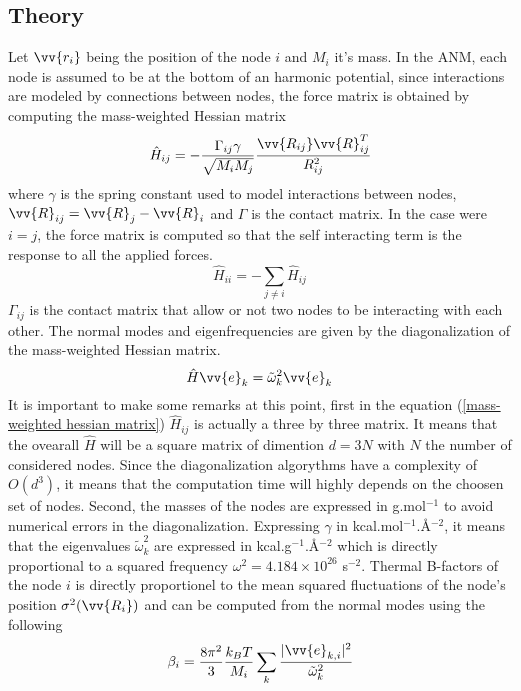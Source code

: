 \subsection{Theory}
\noindent Let $\vv{r_i}$ being the position of the node $i$ and $M_i$ it's mass. In the ANM, each node is assumed to be at the bottom of an harmonic potential, since interactions are modeled by connections between nodes, the force matrix is obtained by computing the mass-weighted Hessian matrix
\begin{equation}
	\label{mass-weighted hessian matrix}
	\hat{H}_{ij} = -\frac{\Gamma_{ij}\gamma}{\sqrt{M_iM_j}}\cfrac{\vv{R_{ij}}\vv{R}^T_ {ij}}{R^2_ {ij}}
\end{equation}
where $\gamma$ is the spring constant used to model interactions between nodes, $\vv{R}_{ij} = \vv{R}_j - \vv{R}_i$ and $\Gamma$ is the contact matrix. In the case were $i = j$, the force matrix is computed so that the self interacting term is the response to all the applied forces.
\begin{equation}
	\label{self interacting terms}
	\hat{H}_{ii} = -\sum_{j \ne i}\hat{H}_{ij}
\end{equation}
$\Gamma_{ij}$ is the contact matrix that allow or not two nodes to be interacting with each other. The normal modes and eigenfrequencies are given by the diagonalization of the mass-weighted Hessian matrix.
\begin{equation}
	\label{eigen equation}
	\hat{H}\vv{e}_k = \tilde{\omega}_k^2\vv{e}_k
\end{equation}
It is important to make some remarks at this point, first in the equation (\ref{mass-weighted hessian matrix}) $\hat{H}_{ij}$ is actually a three by three matrix. It means that the ovearall $\hat{H}$ will be a square matrix of dimention $d = 3N$ with $N$ the number of considered nodes. Since the diagonalization algorythms have a complexity of $O(d^3)$, it means that the computation time will highly depends on the choosen set of nodes. Second, the masses of the nodes are expressed in g.mol$^{-1}$ to avoid numerical errors in the diagonalization. Expressing $\gamma$ in kcal.mol$^{-1}$.\AA$^{-2}$, it means that the eigenvalues $\tilde{\omega}_k^2$ are expressed in kcal.g$^{-1}$.\AA$^{-2}$ which is directly proportional to a squared frequency $\omega^2 = 4.184 \times 10^{26}$ s$^{-2}$. Thermal B-factors of the node $i$ is directly proportionel to the mean squared fluctuations of the node's position $\sigma^2(\vv{R_i})$ and can be computed from the normal modes using the following 
\begin{equation}
	\label{thermal B-factors}
	\beta_i = \frac{8\pi^2}{3}\frac{k_BT}{M_i}\sum_k\cfrac{\vert\vv{e}_{k, i}\vert^2}{\tilde{\omega}_k^2}
\end{equation}
